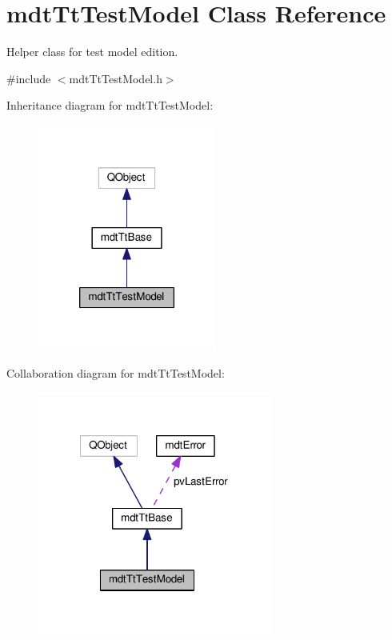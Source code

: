 \hypertarget{classmdt_tt_test_model}{\section{mdt\-Tt\-Test\-Model Class Reference}
\label{classmdt_tt_test_model}
}


Helper class for test model edition.  




{\ttfamily \#include $<$mdt\-Tt\-Test\-Model.\-h$>$}



Inheritance diagram for mdt\-Tt\-Test\-Model\-:
\nopagebreak
\begin{figure}[H]
\begin{center}
\leavevmode
\includegraphics[width=166pt]{classmdt_tt_test_model__inherit__graph}
\end{center}
\end{figure}


Collaboration diagram for mdt\-Tt\-Test\-Model\-:
\nopagebreak
\begin{figure}[H]
\begin{center}
\leavevmode
\includegraphics[width=218pt]{classmdt_tt_test_model__coll__graph}
\end{center}
\end{figure}
